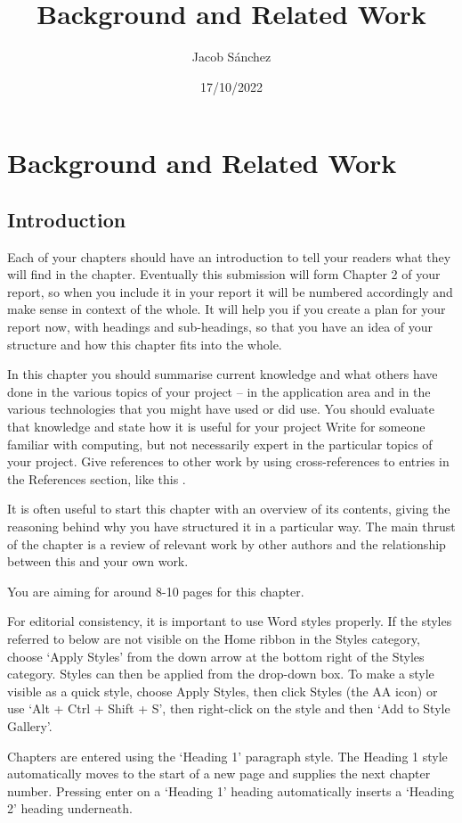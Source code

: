 \documentclass[a4paper,11pt]{bgwork}
\author{Jacob Sánchez}
\title{Background and Related Work}
\date{17/10/2022}
\begin{document}
\section{Background and Related Work}
\subsection{Introduction}

Each of your chapters should have an introduction to tell your readers what they will find in the chapter. Eventually this submission will form Chapter 2 of your report, so when you include it in your report it will be numbered accordingly and make sense in context of the whole. It will help you if you create a plan for your report now, with headings and sub-headings, so that you have an idea of your structure and how this chapter fits into the whole.

In this chapter you should summarise current knowledge and what others have done in the various topics of your project – in the application area and in the various technologies that you might have used or did use. You should evaluate that knowledge and state how it is useful for your project Write for someone familiar with computing, but not necessarily expert in the particular topics of your project. Give references to other work by using cross-references to entries in the References section, like this \parencite{turner2002rules}.

It is often useful to start this chapter with an overview of its contents, giving the reasoning behind why you have structured it in a particular way. The main thrust of the chapter is a review of relevant work by other authors and the relationship between this and your own work.

You are aiming for around 8-10 pages for this chapter.

For editorial consistency, it is important to use Word styles properly. If the styles referred to below are not visible on the Home ribbon in the Styles category, choose ‘Apply Styles’ from the down arrow at the bottom right of the Styles category. Styles can then be applied from the drop-down box. To make a style visible as a quick style, choose Apply Styles, then click Styles (the AA icon) or use ‘Alt + Ctrl + Shift + S’, then right-click on the style and then ‘Add to Style Gallery’.

Chapters are entered using the ‘Heading 1’ paragraph style. The Heading 1 style automatically moves to the start of a new page and supplies the next chapter number. Pressing enter on a ‘Heading 1’ heading automatically inserts a ‘Heading 2’ heading underneath.
\end{document}
